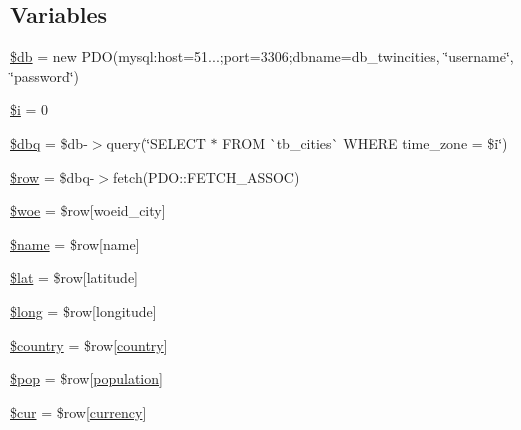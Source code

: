 \subsection*{Variables}
\begin{DoxyCompactItemize}
\item 
\mbox{\hyperlink{rss__population_8php_a1fa3127fc82f96b1436d871ef02be319}{\$db}} = new P\+DO(\textquotesingle{}mysql\+:host=51...;port=3306;dbname=db\+\_\+twincities\textquotesingle{}, \char`\"{}username\char`\"{}, \char`\"{}password\char`\"{})
\item 
\mbox{\hyperlink{rss__population_8php_a83018d9153d17d91fbcf3bc10158d34f}{\$i}} = 0
\item 
\mbox{\hyperlink{rss__population_8php_ab76933014035168a37e7e525ca8fbabe}{\$dbq}} = \$db-\/$>$query(\char`\"{}S\+E\+L\+E\+CT $\ast$ F\+R\+OM \`{}tb\+\_\+cities\`{} W\+H\+E\+RE \textquotesingle{}time\+\_\+zone\textquotesingle{} = \$i\char`\"{})
\item 
\mbox{\hyperlink{rss__population_8php_aa1d731aa570613e5bcff831bb10e9b87}{\$row}} = \$dbq-\/$>$fetch(P\+D\+O\+::\+F\+E\+T\+C\+H\+\_\+\+A\+S\+S\+OC)
\item 
\mbox{\hyperlink{rss__population_8php_a9c60c35ed0a350bd70ae19e37d4e8e40}{\$woe}} = \$row\mbox{[}\textquotesingle{}woeid\+\_\+city\textquotesingle{}\mbox{]}
\item 
\mbox{\hyperlink{rss__population_8php_ab2fc40d43824ea3e1ce5d86dee0d763b}{\$name}} = \$row\mbox{[}\textquotesingle{}name\textquotesingle{}\mbox{]}
\item 
\mbox{\hyperlink{rss__population_8php_af498b42b83afed4dfe0af05fd802776c}{\$lat}} = \$row\mbox{[}\textquotesingle{}latitude\textquotesingle{}\mbox{]}
\item 
\mbox{\hyperlink{rss__population_8php_a30223182013e2964ccbd7c134b3c52c1}{\$long}} = \$row\mbox{[}\textquotesingle{}longitude\textquotesingle{}\mbox{]}
\item 
\mbox{\hyperlink{rss__population_8php_a1437a5f6eb157f0eb267a26e0ad4f1ba}{\$country}} = \$row\mbox{[}\textquotesingle{}\mbox{\hyperlink{index_8php_a0f0752705301c982dc8994ebc993e6e9}{country}}\textquotesingle{}\mbox{]}
\item 
\mbox{\hyperlink{rss__population_8php_a7ea9fc9a2200e371338829cd01e0c33e}{\$pop}} = \$row\mbox{[}\textquotesingle{}\mbox{\hyperlink{index_8php_aa78fa356925cd3f67d485c4d6846202b}{population}}\textquotesingle{}\mbox{]}
\item 
\mbox{\hyperlink{rss__population_8php_a4ce296bba5f9b13816a1ef3e303f2efd}{\$cur}} = \$row\mbox{[}\textquotesingle{}\mbox{\hyperlink{index_8php_abd84e0698c321abdbf211d5b8425d0b5}{currency}}\textquotesingle{}\mbox{]}

\end{DoxyCompactItemize}
